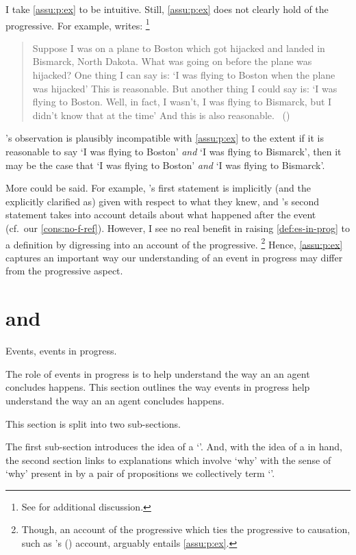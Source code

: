 \begin{note}
  I take \autoref{assu:p:ex} to be intuitive.
  Still, \autoref{assu:p:ex} does not clearly hold of the progressive.
  For example, \citeauthor{Landman:1992wh} writes:%
  \footnote{
    See \textcite{Bonomi:1997uq} for additional discussion.
  }

  \begin{quote}
    Suppose I was on a plane to Boston which got hijacked and landed in Bismarck, North Dakota.
    What was going on before the plane was hijacked?
    One thing I can say is:
    `I was flying to Boston when the plane was hijacked'
    This is reasonable.
    But another thing I could say is:
    `I was flying to Boston.
    Well, in fact, I wasn't, I was flying to Bismarck, but I didn't know that at the time'
    And this is also reasonable.%
    \mbox{ }\hfill\mbox{(\citeyear[30--31]{Landman:1992wh})}
  \end{quote}
  \citeauthor{Landman:1992wh}'s observation is plausibly incompatible with \autoref{assu:p:ex} to the extent if it is reasonable to say `I was flying to Boston' \emph{and} `I was flying to Bismarck', then it may be the case that `I was flying to Boston' \emph{and} `I was flying to Bismarck'.

  More could be said.
  For example, \citeauthor{Landman:1992wh}'s first statement is implicitly (and the explicitly clarified as) given with respect to what they knew, and \citeauthor{Landman:1992wh}'s second statement takes into account details about what happened after the event (cf.\ our \autoref{cons:no-f-ref}).
  However, I see no real benefit in raising \autoref{def:es-in-prog} to a definition by digressing into an account of the progressive.%
  \footnote{
    Though, an account of the progressive which ties the progressive to causation, such as \citeauthor{Szabo:2004ul}'s (\citeyear{Szabo:2004ul}) account, arguably entails \autoref{assu:p:ex}.
  }
  Hence, \autoref{assu:p:ex} captures an important way our understanding of an event in progress may differ from the progressive aspect.
\end{note}



\section{ and \progEx{}}
\label{sec:se3-progex}


\begin{note}
  Events, events in progress.

  The role of events in progress is to help understand the way an  an agent concludes happens.
  This section outlines the way events in progress help understand the way an  an agent concludes happens.

  This section is split into two sub-sections.

  The first sub-section introduces the idea of a `\se{}'.
  And, with the idea of a \se{} in hand, the second section links \se{} to explanations which involve `why' with the sense of `why' present in \qWhy{} by a pair of propositions we collectively term `\progEx{}'.
\end{note}



